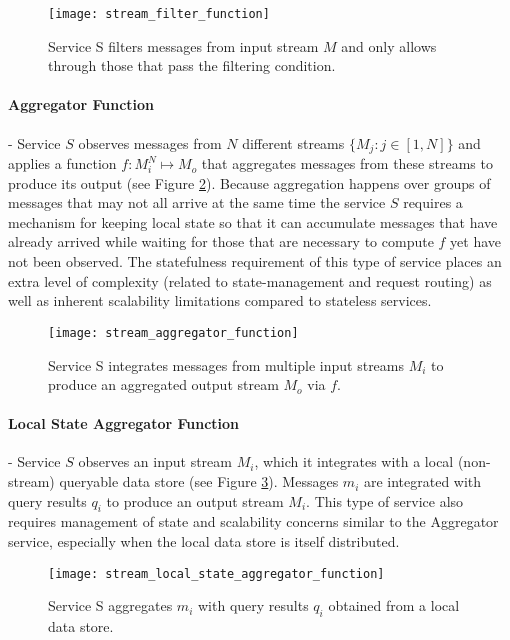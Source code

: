 \begin{figure}[H]
\texttt{[image: stream\_filter\_function]}
\centering
\caption {Service S filters messages from input stream $M$ and only allows through those that pass the filtering condition.}
\label{fig:stream_filter_function}
\end{figure}

\paragraph{Aggregator Function} - Service $S$ observes messages from $N$ different streams $\{M_j: j \in [1,N]\}$ and applies a function $f:M_i^N \mapsto M_o$ that aggregates messages from these streams to produce its output (see Figure \ref{fig:stream_aggregator_function}). Because aggregation happens over groups of messages that may not all arrive at the same time the service $S$ requires a mechanism for keeping local state so that it can accumulate messages that have already arrived while waiting for those that are necessary to compute $f$ yet have not been observed. The statefulness requirement of this type of service places an extra level of complexity (related to state-management and request routing) as well as inherent scalability limitations compared to stateless services\autocite{oppenheimer2002architecture}.

\begin{figure}[H]
\texttt{[image: stream\_aggregator\_function]}
\centering
\caption {Service S integrates messages from multiple input streams $M_i$ to produce an aggregated output stream $M_o$ via $f$.}
\label{fig:stream_aggregator_function}
\end{figure}


\paragraph{Local State Aggregator Function} - Service $S$ observes an input stream $M_i$, which it integrates with a local (non-stream) queryable data store (see Figure \ref{fig:stream_local_state_aggregator_function}). Messages $m_i$ are integrated with query results $q_i$ to produce an output stream $M_i$. This type of service also requires management of state and scalability concerns similar to the Aggregator service, especially when the local data store is itself distributed. 

\begin{figure}[H]
\texttt{[image: stream\_local\_state\_aggregator\_function]}
\centering
\caption {Service S aggregates $m_i$ with query results $q_i$ obtained from a local data store.}
\label{fig:stream_local_state_aggregator_function}
\end{figure}


